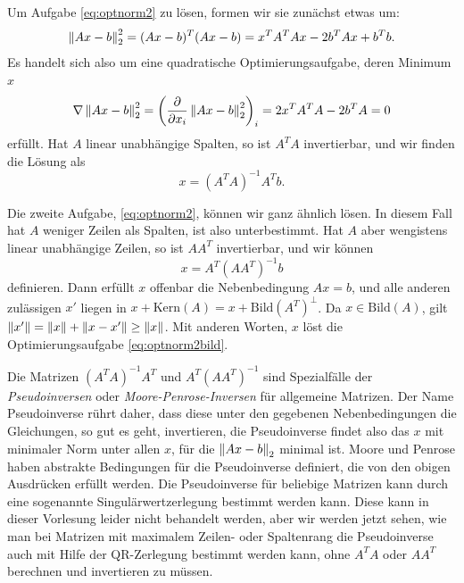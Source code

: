 Um Aufgabe \eqref{eq:optnorm2} zu lösen, formen wir sie zunächst etwas um:
\begin{equation}
  \left\lVert{Ax - b}\right\rVert^2_2 = (Ax - b)^T(Ax - b)
  = x^TA^TAx - 2b^TAx + b^Tb.
\end{equation}
Es handelt sich also um eine quadratische Optimierungsaufgabe, deren
Minimum $x$
\begin{equation}
  \nabla \left\lVert{Ax - b}\right\rVert^2_2 = \left(\frac{\partial}{\partial x_i} \left\lVert{Ax -
    b}\right\rVert^2_2\right)_i = 2x^TA^TA - 2b^TA = 0
\end{equation}
erfüllt. Hat $A$ linear unabhängige Spalten, so ist $A^TA$ invertierbar,
und wir finden die Lösung als
\begin{equation}
  x = (A^TA)^{-1}A^Tb.
\end{equation}

Die zweite Aufgabe, \eqref{eq:optnorm2}, können wir ganz ähnlich
lösen. In diesem Fall hat $A$ weniger Zeilen als Spalten, ist also
unterbestimmt. Hat $A$ aber wengistens linear unabhängige Zeilen, so
ist $AA^T$ invertierbar, und wir können
\begin{equation}
  x = A^T(AA^T)^{-1}b
\end{equation}
definieren. Dann erfüllt $x$ offenbar die Nebenbedingung $Ax=b$, und
alle anderen zulässigen $x'$ liegen in $x + \text{Kern}(A) = x +
\text{Bild}(A^T)^\perp$. Da $x\in\text{Bild}(A)$, gilt
$\left\lVert{x'}\right\rVert=\left\lVert{x}\right\rVert + \left\lVert{x-x'}\right\rVert\ge \left\lVert{x}\right\rVert$. Mit anderen Worten,
$x$ löst die Optimierungsaufgabe \eqref{eq:optnorm2bild}.

Die Matrizen $(A^TA)^{-1}A^T$ und $A^T(AA^T)^{-1}$ sind Spezialfälle
der \emph{Pseudoinversen} oder \emph{Moore-Penrose-Inversen} für
allgemeine Matrizen. Der Name Pseudoinverse rührt daher, dass diese
unter den gegebenen Nebenbedingungen die Gleichungen, so gut es geht,
invertieren, die Pseudoinverse findet also das $x$ mit minimaler Norm
unter allen $x$, für die $\left\lVert{Ax-b}\right\rVert_2$ minimal ist.  Moore und
Penrose haben abstrakte Bedingungen für die Pseudoinverse definiert,
die von den obigen Ausdrücken erfüllt werden. Die Pseudoinverse für
beliebige Matrizen kann durch eine sogenannte Singulärwertzerlegung
bestimmt werden kann. Diese kann in dieser Vorlesung leider nicht
behandelt werden, aber wir werden jetzt sehen, wie man bei Matrizen
mit maximalem Zeilen- oder Spaltenrang die Pseudoinverse auch mit
Hilfe der QR-Zerlegung bestimmt werden kann, ohne $A^TA$ oder $AA^T$
berechnen und invertieren zu müssen.

